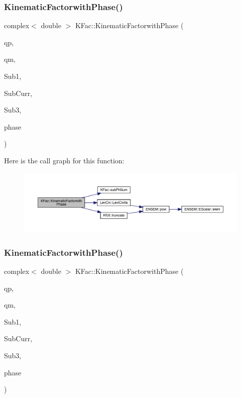 \subsubsection{\texorpdfstring{KinematicFactorwithPhase()}{KinematicFactorwithPhase()}\hspace{0.1cm}{\footnotesize\ttfamily [1/2]}}
{\footnotesize\ttfamily complex$<$ double $>$ K\+Fac\+::\+Kinematic\+Factorwith\+Phase (\begin{DoxyParamCaption}\item[{Eigen\+::\+Vector\+Xd \&}]{qp,  }\item[{Eigen\+::\+Vector\+Xd \&}]{qm,  }\item[{map$<$ int, Eigen\+::\+Matrix\+Xcd $>$ \&}]{Sub1,  }\item[{Eigen\+::\+Matrix\+Xcd \&}]{Sub\+Curr,  }\item[{map$<$ int, Eigen\+::\+Matrix\+Xcd $>$ \&}]{Sub3,  }\item[{\mbox{\hyperlink{structPh_1_1phChars}{Ph\+::ph\+Chars}} \&}]{phase }\end{DoxyParamCaption})}

Here is the call graph for this function\+:
\nopagebreak
\begin{figure}[H]
\begin{center}
\leavevmode
\includegraphics[width=350pt]{d2/d89/namespaceKFac_a5fe5ea6a5ab8c5c87ca764f254396434_cgraph}
\end{center}
\end{figure}
\mbox{\label{namespaceKFac_ac10b1bd8db1661c292e327a3eabcebb9}} 
\subsubsection{\texorpdfstring{KinematicFactorwithPhase()}{KinematicFactorwithPhase()}\hspace{0.1cm}{\footnotesize\ttfamily [2/2]}}
{\footnotesize\ttfamily complex$<$ double $>$ K\+Fac\+::\+Kinematic\+Factorwith\+Phase (\begin{DoxyParamCaption}\item[{Eigen\+::\+Vector\+Xd \&}]{qp,  }\item[{Eigen\+::\+Vector\+Xd \&}]{qm,  }\item[{map$<$ int, Eigen\+::\+Matrix\+Xcd $>$ \&}]{Sub1,  }\item[{map$<$ int, Eigen\+::\+Matrix\+Xcd $>$ \&}]{Sub\+Curr,  }\item[{map$<$ int, Eigen\+::\+Matrix\+Xcd $>$ \&}]{Sub3,  }\item[{\mbox{\hyperlink{structPh_1_1phChars}{Ph\+::ph\+Chars}} \&}]{phase }\end{DoxyParamCaption})}

